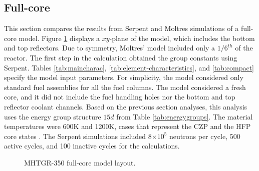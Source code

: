\subsection{Full-core}
\label{sec:neut-fullcore}

This section compares the results from Serpent and Moltres simulations of a full-core model.
Figure \ref{fig:fullcoremodel} displays a $xy$-plane of the model, which includes the bottom and top reflectors.
Due to symmetry, Moltres' model included only a $1/6^{th}$ of the reactor.
The first step in the calculation obtained the group constants using Serpent.
Tables \ref{tab:maincharac}, \ref{tab:element-characteristics}, and \ref{tab:compact} specify the model input parameters.
For simplicity, the model considered only standard fuel assemblies for all the fuel columns.
The model considered a fresh core, and it did not include the fuel handling holes nor the bottom and top reflector coolant channels.
Based on the previous section analyses, this analysis uses the energy group structure $15d$ from Table \ref{tab:energygroups}.
The material temperatures were 600K and 1200K, cases that represent the \gls{CZP} and the \gls{HFP} core states \cite{strydom_results_2015}.
The Serpent simulations included 8$\times 10^5$ neutrons per cycle, 500 active cycles, and 100 inactive cycles for the calculations.

\begin{figure}[htbp!]
	\centering
	\hfill
  \caption{MHTGR-350 full-core model layout.}
	\label{fig:fullcoremodel}
\end{figure}

